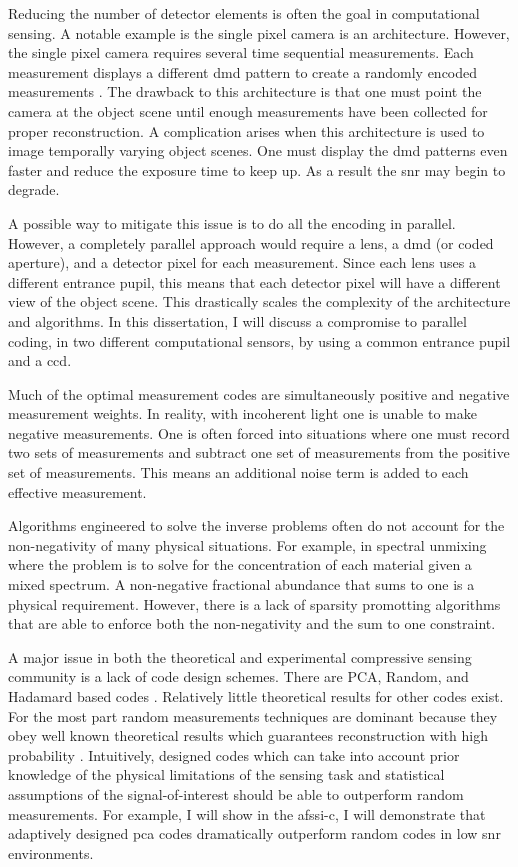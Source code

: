 Reducing the number of detector elements is often the goal in computational sensing. A notable example is the single pixel camera is an architecture. However, the single pixel camera requires several time sequential measurements. Each measurement displays a different \gls{dmd} pattern to create a randomly encoded measurements \cite{duarte2008single}. The drawback to this architecture is that one must point the camera at the object scene until enough measurements have been collected for proper reconstruction. A complication arises when this architecture is used to image temporally varying object scenes. One must display the \gls{dmd} patterns even faster and reduce the exposure time to keep up. As a result the \gls{snr} may begin to degrade. 

A possible way to mitigate this issue is to do all the encoding in parallel. However, a completely parallel approach would require a lens, a \gls{dmd} (or coded aperture), and a detector pixel for each measurement. Since each lens uses a different entrance pupil, this means that each detector pixel will have a different view of the object scene. This drastically scales the complexity of the architecture and algorithms. In this dissertation, I will discuss a compromise to parallel coding, in two different computational sensors, by using a common entrance pupil and a \gls{ccd}.

Much of the optimal measurement codes are simultaneously positive and negative measurement weights. In reality, with incoherent light one is unable to make negative measurements. One is often forced into situations where one must record two sets of measurements and subtract one set of measurements from the positive set of measurements. This means an additional noise term is added to each effective measurement. 

Algorithms engineered to solve the inverse problems often do not account for the non-negativity of many physical situations. For example, in spectral unmixing where the problem is to solve for the concentration of each material given a mixed spectrum. A non-negative fractional abundance that sums to one is a physical requirement. However, there is a lack of sparsity promotting algorithms that are able to enforce both the non-negativity and the sum to one constraint. 

A major issue in both the theoretical and experimental compressive sensing community is a lack of code design schemes. There are PCA, Random, and Hadamard based codes \cite{brady2009optical}. Relatively little theoretical results for other codes exist. For the most part random measurements techniques are dominant because they obey well known theoretical results which guarantees reconstruction with high probability \cite{donoho2006compressed, candes2008introduction, tropp2006just}. Intuitively, designed codes which can take into account prior knowledge of the physical limitations of the sensing task and statistical assumptions of the signal-of-interest should be able to outperform random measurements. For example, I will show in the \gls{afssi-c}, I will demonstrate that adaptively designed \gls{pca} codes dramatically outperform random codes in low \gls{snr} environments. 

